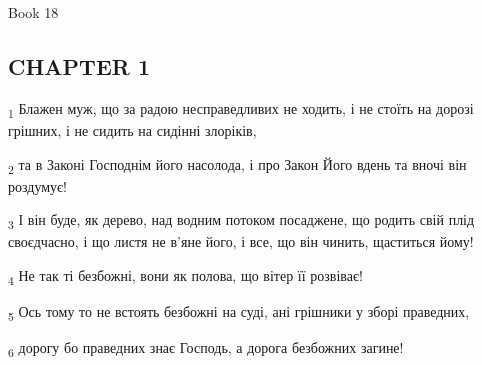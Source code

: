 Book 18
\subsection{CHAPTER 1}
\begin{tcolorbox}
\textsubscript{1} Блажен муж, що за радою несправедливих не ходить, і не стоїть на дорозі грішних, і не сидить на сидінні злоріків,
\end{tcolorbox}
\begin{tcolorbox}
\textsubscript{2} та в Законі Господнім його насолода, і про Закон Його вдень та вночі він роздумує!
\end{tcolorbox}
\begin{tcolorbox}
\textsubscript{3} І він буде, як дерево, над водним потоком посаджене, що родить свій плід своєдчасно, і що листя не в'яне його, і все, що він чинить, щаститься йому!
\end{tcolorbox}
\begin{tcolorbox}
\textsubscript{4} Не так ті безбожні, вони як полова, що вітер її розвіває!
\end{tcolorbox}
\begin{tcolorbox}
\textsubscript{5} Ось тому то не встоять безбожні на суді, ані грішники у зборі праведних,
\end{tcolorbox}
\begin{tcolorbox}
\textsubscript{6} дорогу бо праведних знає Господь, а дорога безбожних загине!
\end{tcolorbox}
